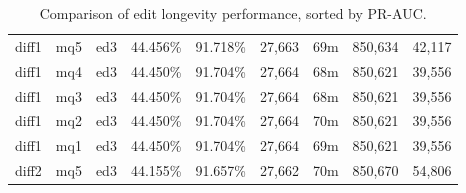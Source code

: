 \begin{sidewaystable}[!ph]
\begin{center}
\begin{tabular}{|c|c|c||c|c||c|c|c|c|}
diff1 & mq5 & ed3 & 44.456\% & 91.718\% & 27,663 & 69m & 850,634 & 42,117 \\
diff1 & mq4 & ed3 & 44.450\% & 91.704\% & 27,664 & 68m & 850,621 & 39,556 \\
diff1 & mq3 & ed3 & 44.450\% & 91.704\% & 27,664 & 68m & 850,621 & 39,556 \\
diff1 & mq2 & ed3 & 44.450\% & 91.704\% & 27,664 & 70m & 850,621 & 39,556 \\
diff1 & mq1 & ed3 & 44.450\% & 91.704\% & 27,664 & 69m & 850,621 & 39,556 \\
diff2 & mq5 & ed3 & 44.155\% & 91.657\% & 27,662 & 70m & 850,670 & 54,806 \\
\hline
\end{tabular}
\end{center}
\caption{Comparison of edit longevity performance,
    sorted by PR-AUC.}
\label{tab:editshoutC}
\end{sidewaystable}
\clearpage
